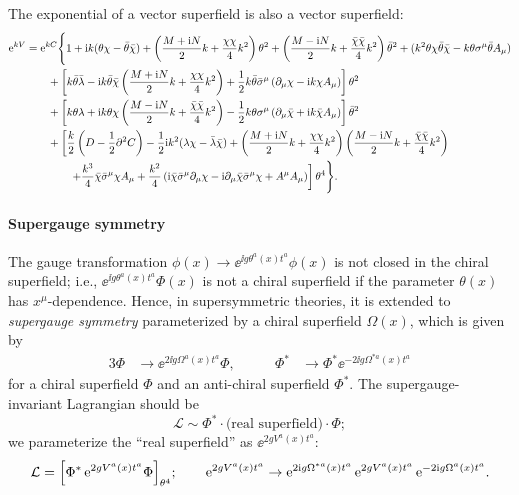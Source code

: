 \documentclass[CheatSheet]{subfiles}
\begin{document}
The exponential of a vector superfield is also a vector superfield:
\begin{equation}
\begin{split}
 \mathop{}\!\mathrm{e}^{kV}&=\mathop{}\!\mathrm{e}^{kC}\Bigg\{
 1+\mathrm{i} k (\theta \chi-\bar\theta\bar{\chi})
 +\left(\frac{M+\mathrm{i} N}{2}k+\frac{\chi\chi}{4}k^2\right) \theta^2
 +\left(\frac{M-\mathrm{i} N}{2}k+\frac{\bar\chi\bar\chi}{4}k^2\right) \bar\theta^2
 +(k^2\theta \chi\bar\theta\bar{\chi}-k\theta \sigma^{\mu}\bar\theta A_{\mu})
 \\&\qquad
 +\left[k\bar\theta \bar\lambda-\mathrm{i} k \bar\theta \bar\chi\left(\frac{M+\mathrm{i} N}{2}k+\frac{\chi\chi}{4}k^2\right)
 +\frac12 k\bar\theta\bar\sigma^{\mu}\left(\partial_{\mu}\chi -\mathrm{i} k \chi A_\mu\right)
 \right] \theta^2
 \\&\qquad
 +\left[k\theta \lambda+\mathrm{i} k \theta \chi\left(\frac{M-\mathrm{i} N}{2}k+\frac{\bar{\chi}\bar{\chi}}{4}k^2\right)
 -\frac12 k\theta \sigma^{\mu}\left(\partial_{\mu}\bar{\chi}+\mathrm{i} k \bar\chi A_\mu\right)
 \right] \bar\theta^2
 \\&\qquad
 +\left[
 \frac{k}{2} \left(D-\frac12\partial^2 C\right)
 -\frac{1}{2} \mathrm{i} k^2 (\lambda\chi-\bar\lambda\bar\chi)
 + \left(\frac{M+\mathrm{i} N}{2}k+\frac{\chi\chi}{4}k^2\right)\left(\frac{M-\mathrm{i} N}{2}k+\frac{\bar\chi\bar\chi}{4}k^2\right)
 \right.\\&\qquad\qquad\left.
 +\frac{k^3}{4} \bar\chi\bar\sigma^{\mu}\chi A_{\mu}
 +\frac{k^2}{4}\left(\mathrm{i} \bar\chi\bar\sigma^{\mu}\partial_{\mu}\chi-\mathrm{i} \partial_{\mu}\bar\chi\bar\sigma^{\mu}\chi+A^{\mu}A_{\mu}\right)
 \right]\theta^4\Bigg\}.
\end{split}
\end{equation}
\paragraph{Supergauge symmetry}
The gauge transformation $\phi(x)\to\ee^{\ii g \theta^a(x)t^a}\phi(x)$ is not closed in the chiral superfield; i.e., $\ee^{\ii g \theta^a(x)t^a}\Phi(x)$ is not a chiral superfield if the parameter $\theta(x)$ has $x^\mu$-dependence.
Hence, in supersymmetric theories, it is extended to \emph{supergauge symmetry} parameterized by a chiral superfield $\Omega(x)$, which is given by
\begin{alignat}{3}
 \Phi   &\to\ee^{2\ii g \Omega^a(x) t^a}\Phi,
&\qquad
 \Phi^* &\to\Phi^*\ee^{-2\ii g \Omega^{*a}(x) t^a}
\end{alignat}
for a chiral superfield $\Phi$ and an anti-chiral superfield $\Phi^*$.
The supergauge-invariant Lagrangian should be
\begin{equation}
 \mathcal L \sim \Phi^*\cdot\text{(real superfield)}\cdot\Phi;
\end{equation}
we parameterize the ``real superfield'' as $\ee^{2g V^a(x)t^a}$:
\begin{equation}
 \mathcal L = \Bigl[\Phi^*\mathop{}\!\mathrm{e}^{2g V^a(x)t^a}\Phi\Bigr]_{\theta^4};
\qquad
 \mathop{}\!\mathrm{e}^{2g V^a(x)t^a}\to
\mathop{}\!\mathrm{e}^{2\mathrm{i} g \Omega^{*a}(x) t^a}
 \mathop{}\!\mathrm{e}^{2g V^a(x)t^a}
\mathop{}\!\mathrm{e}^{-2\mathrm{i} g \Omega^a(x) t^a}.
\end{equation}
\end{document}

